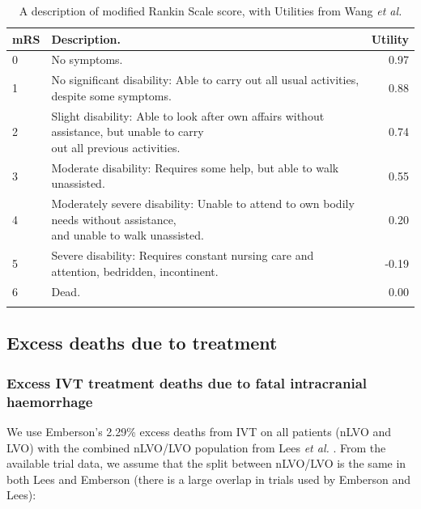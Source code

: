 \begin{minipage}{\textwidth}
\renewcommand*{\arraystretch}{1.5} %
\begin{longtable}[]{@{}llr@{}}
\caption{A description of modified Rankin Scale score, with Utilities from Wang \textit{et al.}\cite{wang_utility-weighted_2020}}\\
\toprule
mRS & Description. & Utility\tabularnewline
\midrule
\endhead
0 & No symptoms. & 0.97\tabularnewline
1 & No significant disability: Able to carry out all usual activities,
despite some symptoms. & 0.88\tabularnewline
2 & \makecell[l]{Slight disability: Able to look after own affairs without assistance, but unable to carry \\ out all previous activities.} &
0.74\tabularnewline
3 & Moderate disability: Requires some help, but able to walk
unassisted. & 0.55\tabularnewline
4 & \makecell[l]{Moderately severe disability: Unable to attend to own bodily needs without assistance, \\ and unable to walk unassisted.} & 0.20\tabularnewline
5 & Severe disability: Requires constant nursing care and attention,
bedridden, incontinent. & -0.19\tabularnewline
6 & Dead. & 0.00\tabularnewline
\bottomrule
\label{app_tab:mrs}
\end{longtable}
\end{minipage}

\subsection{Excess deaths due to treatment}

\subsubsection{Excess IVT treatment deaths due to fatal intracranial haemorrhage}
\label{excess_deaths_ivt}

We use Emberson's 2.29\% excess deaths from IVT on all patients (nLVO and LVO) \cite{emberson_effect_2014} with the combined nLVO/LVO population from Lees \textit{et al.} \cite{lees_time_2010}. From the available trial data, we assume that the split between nLVO/LVO is the same in both Lees and Emberson (there is a large overlap in trials used by Emberson and Lees):

